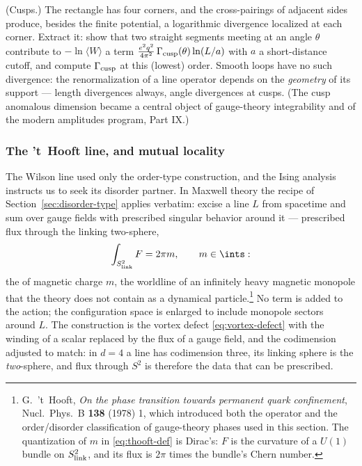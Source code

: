 \begin{exercise}[medium]
\label{exr:cusp}
(Cusps.) The rectangle has four corners, and the cross-pairings of
adjacent sides produce, besides the finite potential, a logarithmic
divergence localized at each corner. Extract it: show that two straight
segments meeting at an angle $\theta$ contribute to $-\ln\langle W
\rangle$ a term $\frac{e^2 q^2}{4\pi^2}\,\Gamma_{\rm cusp}(\theta) \ln
(L/a)$ with $a$ a short-distance cutoff, and compute
$\Gamma_{\rm cusp}$ at this (lowest) order. Smooth loops have no such
divergence: the renormalization of a line operator depends on the
\emph{geometry} of its support --- length divergences always, angle
divergences at cusps. (The cusp anomalous dimension became a central
object of gauge-theory integrability and of the modern amplitudes
program, Part IX.)
\end{exercise}

\subsubsection{The 't~Hooft line, and mutual locality}
\label{sec:thooft-line}
\label{sec:dirac-pairing}

The Wilson line used only the order-type construction, and the Ising
analysis instructs us to seek its disorder partner. In Maxwell theory the
recipe of Section~\ref{sec:disorder-type} applies verbatim: excise a
line $L$ from spacetime and sum over gauge fields with prescribed
singular behavior around it --- prescribed flux through the linking
two-sphere,
\begin{equation}
\int_{S^2_{\mathrm{link}}} F = 2\pi m, \qquad m \in \ints :
\label{eq:thooft-def}
\end{equation}
the  of magnetic charge $m$, the worldline of an
infinitely heavy magnetic monopole that the theory does not contain as a
dynamical particle.\footnote{G.~'t~Hooft, \emph{On the phase transition
towards permanent quark confinement}, Nucl.\ Phys.\ B \textbf{138}
(1978) 1, which introduced both the operator and the order/disorder
classification of gauge-theory phases used in this section. The
quantization of $m$ in \eqref{eq:thooft-def} is Dirac's: $F$ is the
curvature of a $U(1)$ bundle on $S^2_{\rm link}$, and its flux is
$2\pi$ times the bundle's Chern number.} No term is added to the
action; the configuration space is enlarged to include monopole sectors
around $L$. The construction is the vortex defect
\eqref{eq:vortex-defect} with the winding of a scalar replaced by the
flux of a gauge field, and the codimension adjusted to match: in $d = 4$
a line has codimension three, its linking sphere is the
\emph{two}-sphere, and flux through $S^2$ is therefore the data that
can be prescribed.

